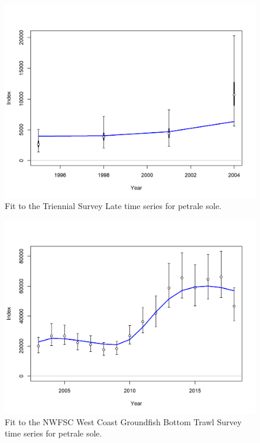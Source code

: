 \documentclass[12pt,]{article}
\begin{document}
\FloatBarrier 

\begin{figure}
\centering
\includegraphics{r4ss/plots_mod1/index2_cpuefit_Triennial - Late.png}
\caption{Fit to the Triennial Survey Late time series for petrale sole.
\label{fig:fit_tri_late}}
\end{figure}

\FloatBarrier 

\begin{figure}
\centering
\includegraphics{r4ss/plots_mod1/index2_cpuefit_NWFSC West Coast Groundfish Bottom Trawl Survey.png}
\caption{Fit to the NWFSC West Coast Groundfish Bottom Trawl Survey time
series for petrale sole. \label{fig:fit_nwfsc_survey}}
\end{figure}
\end{document}
